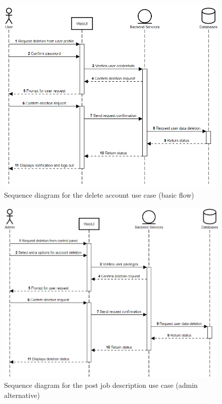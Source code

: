 \documentclass[a4paper]{article}
\begin{document}
\begin{figure}[H]
  \centering
  \includegraphics[width=1.0\textwidth]{delete_account.png}
  \caption{Sequence diagram for the delete account use case (basic flow)}
  \label{fig:fig17}
\end{figure}

\begin{figure}[H]
  \centering
  \includegraphics[width=1.0\textwidth]{delete_account (admin).png}
  \caption{Sequence diagram for the post job description use case (admin alternative)}
  \label{fig:fig18}
\end{figure}
\end{document}
